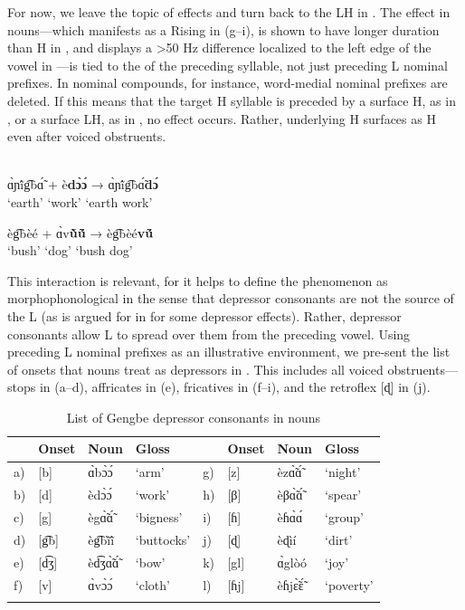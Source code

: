 \documentclass[output=paper
,newtxmath
,modfonts
,nonflat]{langsci/langscibook}
\begin{document}
For now, we leave the topic of   effects and turn back to the LH  in . The  effect in nouns—which manifests as a Rising  in  (g–i), is shown to have longer duration than H in , and displays a >50 Hz  difference localized to the left edge of the vowel in —is tied to the  of the preceding syllable, not just preceding L  nominal prefixes. In nominal compounds, for instance, word-medial nominal prefixes are deleted. If this means that the target H  syllable is preceded by a surface H, as in , or a surface LH, as in , no  effect occurs. Rather, underlying H surfaces as H even after voiced obstruents. 


\\
\ea\label{ex:lotven:1}
    \gll ɑ̀ɲĩ́g͡bɑ̃́ + è\textbf{dɔ̀ɔ́} → ɑ̀ɲĩ́g͡bɑ̃́\textbf{dɔ́}\\
    ‘earth’ {} ‘work’ {} {‘earth work’}     \\
    \glt 
    \z

\ea\label{ex:2}
    \gll èg͡bèé + ɑ̀v\textbf{ũ̀ṹ} → èg͡bèé\textbf{vṹ}\\
    ‘bush’ {} ‘dog’ {} {‘bush dog’}\\
    \glt
    \z
          

This interaction is relevant, for it helps to define the phenomenon as morphophonological in the sense that depressor consonants are not the source of the L  (as is argued for in \citealt{Bradshaw1999} for some depressor effects). Rather, depressor consonants allow L  to spread over them from the preceding vowel. Using preceding L  nominal prefixes as an illustrative environment, we pre-sent the list of  onsets that nouns treat as depressors in . This includes all voiced obstruents—stops in (a–d), affricates in (e), fricatives in (f–i), and the retroflex [ɖ] in (j).

\begin{table}
\begin{tabularx}{\textwidth}{lllXlllX} 
\lsptoprule
&  Onset &  Noun &  Gloss &  &  Onset &  Noun &  Gloss\\
\midrule 
a) & [b]  & ɑ̀bɔ̀ɔ́  & ‘arm’      & {g)} & [z]  & èzɑ̃̀ɑ̃́  & ‘night’\\
b) & [d]  & èdɔ̀ɔ́  & ‘work’     & {h)} & [β]  & èβɑ̃̀ɑ̃́  & ‘spear’\\
c) & [g]  & ègɑ̃̀ɑ̃́  & ‘bigness’  & {i)} & [ɦ]  & èɦɑ̀ɑ́  & ‘group’\\
d) & [g͡b] & èg͡bĩ̀ĩ́ & ‘buttocks’ & {j)} & [ɖ]  & èɖìí          & ‘dirt’\\
e) & [d͡ʒ] & èd͡ʒɑ̃̀ɑ̃́ & ‘bow’      & {k)} & [gl] & ɑ̀glòó         & ‘joy’\\
f) & [v]  & ɑ̀vɔ̀ɔ́  & ‘cloth’    & {l)} & [ɦj] & èɦjɛ̃̀ɛ̃́ & ‘poverty’\\
\lspbottomrule
\end{tabularx}
\caption{List of Gengbe depressor consonants in nouns}
\label{tab:lotven:3}
\end{table}
\end{document}
